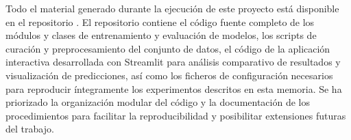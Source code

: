Todo el material generado durante la ejecución de este proyecto está disponible en el repositorio \thegitrepo{}. El repositorio contiene el código fuente completo de los módulos y clases de entrenamiento y evaluación de modelos, los scripts de curación y preprocesamiento del conjunto de datos, el código de la aplicación interactiva desarrollada con Streamlit para análisis comparativo de resultados y visualización de predicciones, así como los ficheros de configuración necesarios para reproducir íntegramente los experimentos descritos en esta memoria. Se ha priorizado la organización modular del código y la documentación de los procedimientos para facilitar la reproducibilidad y posibilitar extensiones futuras del trabajo.
